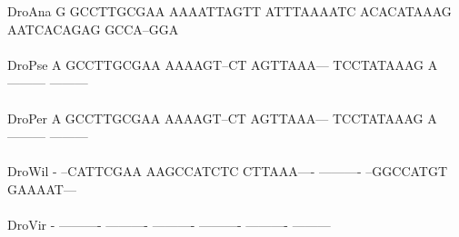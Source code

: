 \documentclass[11pt,twoside,reqno,a4paper]{article}
\begin{document}
{DroAna	G	GCCTTGCGAA	AAAATTAGTT	ATTTAAAATC	ACACATAAAG	AATCACAGAG	GCCA--GGA\\
\hspace*{7\charwidth}\hspace*{1\charwidth}\hspace*{1\charwidth}\hspace*{1\charwidth}\hspace*{1\charwidth}\hspace*{1\charwidth}\hspace*{1\charwidth}\\
DroPse	A	GCCTTGCGAA	AAAAGT--CT	AGTTAAA---	TCCTATAAAG	A---------	---------\\
\hspace*{7\charwidth}\hspace*{1\charwidth}\hspace*{1\charwidth}\hspace*{1\charwidth}\hspace*{1\charwidth}\hspace*{1\charwidth}\hspace*{1\charwidth}\\
DroPer	A	GCCTTGCGAA	AAAAGT--CT	AGTTAAA---	TCCTATAAAG	A---------	---------\\
\hspace*{7\charwidth}\hspace*{1\charwidth}\hspace*{1\charwidth}\hspace*{1\charwidth}\hspace*{1\charwidth}\hspace*{1\charwidth}\hspace*{1\charwidth}\\
DroWil	-	--CATTCGAA	AAGCCATCTC	CTTAAA----	----------	--GGCCATGT	GAAAAT---\\
\hspace*{7\charwidth}\hspace*{1\charwidth}\hspace*{1\charwidth}\hspace*{1\charwidth}\hspace*{1\charwidth}\hspace*{1\charwidth}\hspace*{1\charwidth}\\
DroVir	-	----------	----------	----------	----------	----------	---------\\
\hspace*{7\charwidth}\hspace*{1\charwidth}\hspace*{1\charwidth}\hspace*{1\charwidth}\hspace*{1\charwidth}\hspace*{1\charwidth}\hspace*{1\charwidth}\\
}
\end{document}
